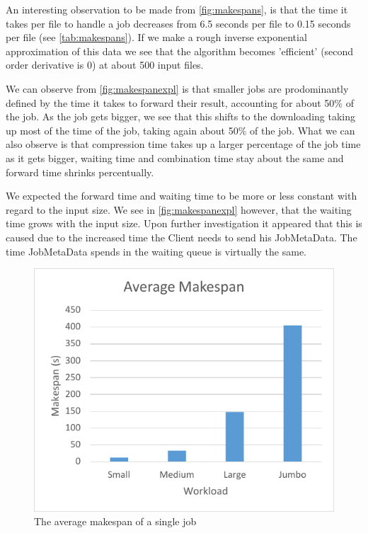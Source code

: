 \documentclass[twocolumn,twoside]{IEEEtran}
\begin{document}
An interesting observation to be made from \autoref{fig:makespans},
is that the time it takes per file to handle a job decreases from
6.5 seconds per file to 0.15 seconds per file (see \autoref{tab:makespans}). If we make a rough
inverse exponential approximation of this data we see that the algorithm
becomes 'efficient' (second order derivative is 0) at about 500 input files.

We can observe from \autoref{fig:makespanexpl} is that smaller jobs
are prodominantly defined by the time it takes to forward their
result, accounting for about 50\% of the job. As the job gets
bigger, we see that this shifts to the downloading taking up
most of the time of the job, taking again about 50\% of the job.
What we can also observe is that compression time takes up
a larger percentage of the job time as it gets bigger, waiting
time and combination time stay about the same and forward time shrinks percentually.

We expected the forward time and waiting time to be more or less constant
with regard to the input size. We see in \autoref{fig:makespanexpl} however,
that the waiting time grows with the input size. Upon further investigation
it appeared that this is caused due to the increased time the Client
needs to send his JobMetaData. The time JobMetaData spends in the waiting
queue is virtually the same.

\begin{figure}[h]
\begin{center}
 \includegraphics[trim=0 0 0 0,keepaspectratio=true,scale=0.8]{makespan}
\caption{The average makespan of a single job}
\label{fig:makespans}
\end{center}
\end{figure}
\end{document}
